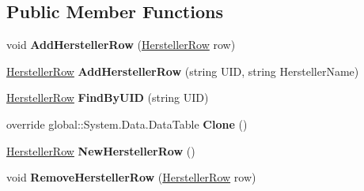 \subsection*{Public Member Functions}
\begin{DoxyCompactItemize}
\item 
void {\bfseries Add\+Hersteller\+Row} (\hyperlink{class_products_1_1_data_1_1ds_sage_1_1_hersteller_row}{Hersteller\+Row} row)\hypertarget{class_products_1_1_data_1_1ds_sage_1_1_hersteller_data_table_aae74d3e723d446b63a0b7d86cc905308}{}\label{class_products_1_1_data_1_1ds_sage_1_1_hersteller_data_table_aae74d3e723d446b63a0b7d86cc905308}

\item 
\hyperlink{class_products_1_1_data_1_1ds_sage_1_1_hersteller_row}{Hersteller\+Row} {\bfseries Add\+Hersteller\+Row} (string U\+ID, string Hersteller\+Name)\hypertarget{class_products_1_1_data_1_1ds_sage_1_1_hersteller_data_table_a15b5beb579324691fb5366994df5ca0b}{}\label{class_products_1_1_data_1_1ds_sage_1_1_hersteller_data_table_a15b5beb579324691fb5366994df5ca0b}

\item 
\hyperlink{class_products_1_1_data_1_1ds_sage_1_1_hersteller_row}{Hersteller\+Row} {\bfseries Find\+By\+U\+ID} (string U\+ID)\hypertarget{class_products_1_1_data_1_1ds_sage_1_1_hersteller_data_table_aca79caf5c449efa3dcf147496ec6f276}{}\label{class_products_1_1_data_1_1ds_sage_1_1_hersteller_data_table_aca79caf5c449efa3dcf147496ec6f276}

\item 
override global\+::\+System.\+Data.\+Data\+Table {\bfseries Clone} ()\hypertarget{class_products_1_1_data_1_1ds_sage_1_1_hersteller_data_table_a9cb9fed5c32823f31d7ece8ed196ebbd}{}\label{class_products_1_1_data_1_1ds_sage_1_1_hersteller_data_table_a9cb9fed5c32823f31d7ece8ed196ebbd}

\item 
\hyperlink{class_products_1_1_data_1_1ds_sage_1_1_hersteller_row}{Hersteller\+Row} {\bfseries New\+Hersteller\+Row} ()\hypertarget{class_products_1_1_data_1_1ds_sage_1_1_hersteller_data_table_a0c084dd5a07faad8e6dfb2fe9654caf8}{}\label{class_products_1_1_data_1_1ds_sage_1_1_hersteller_data_table_a0c084dd5a07faad8e6dfb2fe9654caf8}

\item 
void {\bfseries Remove\+Hersteller\+Row} (\hyperlink{class_products_1_1_data_1_1ds_sage_1_1_hersteller_row}{Hersteller\+Row} row)\hypertarget{class_products_1_1_data_1_1ds_sage_1_1_hersteller_data_table_a61e8d0618cead5640a1ea9a8f390bc13}{}\label{class_products_1_1_data_1_1ds_sage_1_1_hersteller_data_table_a61e8d0618cead5640a1ea9a8f390bc13}

\end{DoxyCompactItemize}
